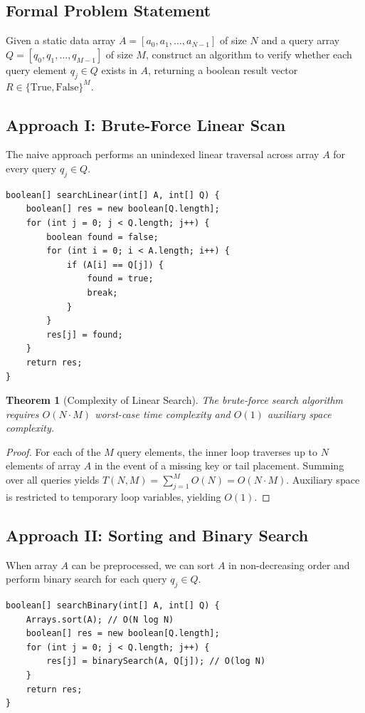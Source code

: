 \documentclass[10pt,journal,compsoc,onecolumn]{IEEEtran}
\newtheorem{theorem}{Theorem}
\begin{document}
\subsection{Formal Problem Statement}
Given a static data array $A = [a_0, a_1, \dots, a_{N-1}]$ of size $N$ and a query array $Q = [q_0, q_1, \dots, q_{M-1}]$ of size $M$, construct an algorithm to verify whether each query element $q_j \in Q$ exists in $A$, returning a boolean result vector $R \in \{\text{True}, \text{False}\}^M$.

\subsection{Approach I: Brute-Force Linear Scan}
The naive approach performs an unindexed linear traversal across array $A$ for every query $q_j \in Q$.

\begin{verbatim}
boolean[] searchLinear(int[] A, int[] Q) {
    boolean[] res = new boolean[Q.length];
    for (int j = 0; j < Q.length; j++) {
        boolean found = false;
        for (int i = 0; i < A.length; i++) {
            if (A[i] == Q[j]) {
                found = true;
                break;
            }
        }
        res[j] = found;
    }
    return res;
}
\end{verbatim}

\begin{theorem}[Complexity of Linear Search]
The brute-force search algorithm requires $O(N \cdot M)$ worst-case time complexity and $O(1)$ auxiliary space complexity.
\end{theorem}
\begin{proof}
For each of the $M$ query elements, the inner loop traverses up to $N$ elements of array $A$ in the event of a missing key or tail placement. Summing over all queries yields $T(N, M) = \sum_{j=1}^{M} O(N) = O(N \cdot M)$. Auxiliary space is restricted to temporary loop variables, yielding $O(1)$.
\end{proof}

\subsection{Approach II: Sorting and Binary Search}
When array $A$ can be preprocessed, we can sort $A$ in non-decreasing order and perform binary search for each query $q_j \in Q$.

\begin{verbatim}
boolean[] searchBinary(int[] A, int[] Q) {
    Arrays.sort(A); // O(N log N)
    boolean[] res = new boolean[Q.length];
    for (int j = 0; j < Q.length; j++) {
        res[j] = binarySearch(A, Q[j]); // O(log N)
    }
    return res;
}
\end{verbatim}
\end{document}
